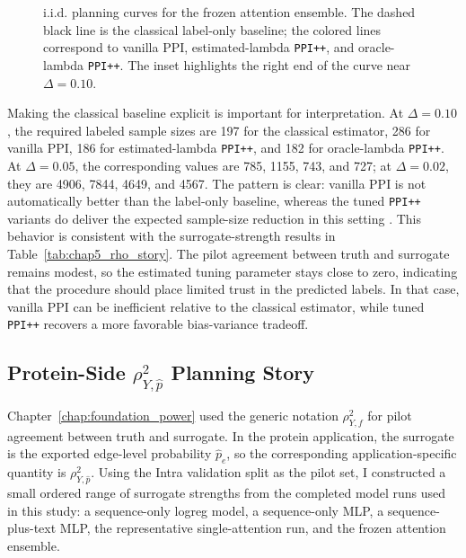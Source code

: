 \begin{figure}[ht]
\centering
{}
\caption[I.I.D. planning curves for the frozen ensemble]{i.i.d. planning curves for the frozen attention ensemble. The dashed black line is the classical label-only baseline; the colored lines correspond to vanilla PPI, estimated-lambda \texttt{PPI++}, and oracle-lambda \texttt{PPI++}. The inset highlights the right end of the curve near $\Delta = 0.10$.}
\label{fig:chap5_power_iid}
\end{figure}

Making the classical baseline explicit is important for interpretation. At $\Delta = 0.10$, the required labeled sample sizes are 197 for the classical estimator, 286 for vanilla PPI, 186 for estimated-lambda \texttt{PPI++}, and 182 for oracle-lambda \texttt{PPI++}. At $\Delta = 0.05$, the corresponding values are 785, 1155, 743, and 727; at $\Delta = 0.02$, they are 4906, 7844, 4649, and 4567. The pattern is clear: vanilla PPI is not automatically better than the label-only baseline, whereas the tuned \texttt{PPI++} variants do deliver the expected sample-size reduction in this setting \parencite{ppi_power}. This behavior is consistent with the surrogate-strength results in Table~\ref{tab:chap5_rho_story}. The pilot agreement between truth and surrogate remains modest, so the estimated tuning parameter stays close to zero, indicating that the procedure should place limited trust in the predicted labels. In that case, vanilla PPI can be inefficient relative to the classical estimator, while tuned \texttt{PPI++} recovers a more favorable bias-variance tradeoff.

\subsection[Protein \texorpdfstring{$\rho_{Y,\hat p}^2$}{rho2} Planning]{Protein-Side \texorpdfstring{$\rho_{Y,\hat p}^2$}{rho2} Planning Story}

Chapter~\ref{chap:foundation_power} used the generic notation \(\rho_{Y,f}^2\) for pilot agreement between truth and surrogate. In the protein application, the surrogate is the exported edge-level probability \(\hat p_e\), so the corresponding application-specific quantity is \(\rho_{Y,\hat p}^2\). Using the Intra validation split as the pilot set, I constructed a small ordered range of surrogate strengths from the completed model runs used in this study: a sequence-only logreg model, a sequence-only MLP, a sequence-plus-text MLP, the representative single-attention run, and the frozen attention ensemble.

